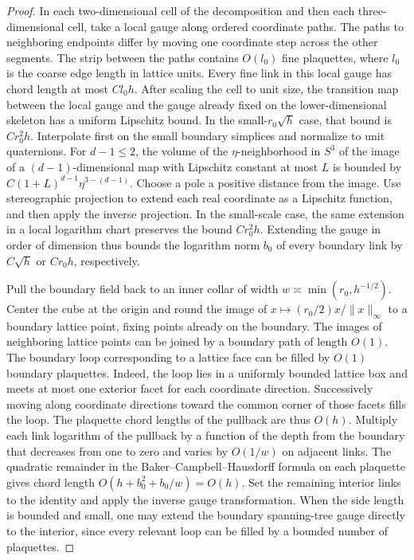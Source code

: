 \documentclass[11pt,a4paper]{article}
\numberwithin{equation}{section}
\begin{document}
\begin{proof}
In each two-dimensional cell of the decomposition and then each three-dimensional cell, take a local gauge along ordered coordinate paths. The paths to neighboring endpoints differ by moving one coordinate step across the other segments. The strip between the paths contains \(O(l_0)\) fine plaquettes, where \(l_0\) is the coarse edge length in lattice units. Every fine link in this local gauge has chord length at most \(Cl_0h\). After scaling the cell to unit size, the transition map between the local gauge and the gauge already fixed on the lower-dimensional skeleton has a uniform Lipschitz bound. In the small-\(r_0\sqrt h\) case, that bound is \(Cr_0^2h\). Interpolate first on the small boundary simplices and normalize to unit quaternions. For \(d-1\le2\), the volume of the \(\eta\)-neighborhood in \(S^3\) of the image of a \((d-1)\)-dimensional map with Lipschitz constant at most \(L\) is bounded by \(C(1+L)^{d-1}\eta^{3-(d-1)}\). Choose a pole a positive distance from the image. Use stereographic projection to extend each real coordinate as a Lipschitz function, and then apply the inverse projection. In the small-scale case, the same extension in a local logarithm chart preserves the bound \(Cr_0^2h\). Extending the gauge in order of dimension thus bounds the logarithm norm \(b_0\) of every boundary link by \(C\sqrt h\) or \(Cr_0h\), respectively.

Pull the boundary field back to an inner collar of width \(w\asymp\min(r_0,h^{-1/2})\). Center the cube at the origin and round the image of \(x\mapsto (r_0/2)x/\|x\|_\infty\) to a boundary lattice point, fixing points already on the boundary. The images of neighboring lattice points can be joined by a boundary path of length \(O(1)\). The boundary loop corresponding to a lattice face can be filled by \(O(1)\) boundary plaquettes. Indeed, the loop lies in a uniformly bounded lattice box and meets at most one exterior facet for each coordinate direction. Successively moving along coordinate directions toward the common corner of those facets fills the loop. The plaquette chord lengths of the pullback are thus \(O(h)\). Multiply each link logarithm of the pullback by a function of the depth from the boundary that decreases from one to zero and varies by \(O(1/w)\) on adjacent links. The quadratic remainder in the Baker--Campbell--Hausdorff formula on each plaquette gives chord length \(O(h+b_0^2+b_0/w)=O(h)\). Set the remaining interior links to the identity and apply the inverse gauge transformation. When the side length is bounded and small, one may extend the boundary spanning-tree gauge directly to the interior, since every relevant loop can be filled by a bounded number of plaquettes.


\end{proof}
\end{document}
